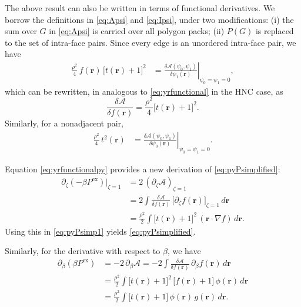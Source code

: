 \documentclass[aip,jcp,reprint,superscriptaddress]{revtex4-1}
\newcommand{\vct}[1]{\mathbf{#1}}
\providecommand{\vr}{} %
\renewcommand{\vr}{\vct{r}}
\newcommand{\supex}[1]{ { { #1 }^{ \mathrm{ex} } } }
\newcommand{\Pex}{\supex{P}}
\newcommand{\A}{\mathcal{A}}
\begin{document}
The above result can also be written
in terms of functional derivatives.
%
We borrow the definitions in
\eqref{eq:Apsi} and \eqref{eq:Ipsi},
under two modifications:
(i) the sum over $G$ in \eqref{eq:Apsi}
is carried over all polygon packs;
(ii) $P(G)$ is replaced to the set of intra-face pairs.
%
Since every edge is an unordered intra-face pair,
we have
%
\begin{align*}
\frac{\rho^2}{4} \, f(\vr) \, \bigl[ t(\vr) + 1 \bigr]^2
&=
\left.
\frac{ \delta \A(\psi_0, \psi_1) } { \delta \psi_1(\vr) }
\right|_{\psi_0 = \psi_1 = 0},
\end{align*}
which can be rewritten,
in analogous to \eqref{eq:yrfunctional} in the HNC case,
as
\begin{equation}
  \frac{ \delta \A } { \delta f(\vr)}
=
  \frac{ \rho^2 } {4}
  \bigl[ t(\vr) + 1 \bigr]^2.
  \label{eq:yrfunctionalpy}
\end{equation}
%
Similarly, for a nonadjacent pair,
\begin{align*}
\frac{\rho^2}{4} \, t^2(\vr)
&=
\left.
\frac{ \delta \A(\psi_0, \psi_1) } { \delta \psi_0(\vr) }
\right|_{\psi_0 = \psi_1 = 0}.
\end{align*}
%


Equation \eqref{eq:yrfunctionalpy} provides a new derivation of \eqref{eq:pyPsimplified}:
%
\begin{align*}
  \partial_\zeta (-\beta \Pex) \big|_{\zeta = 1}
&=
  2 \, (\partial_\zeta \A)_{\zeta = 1}
\\
&=
  2 \int \frac{ \delta \A } { \delta f(\vr) } \,
  \big[ \partial_\zeta f(\vr) \big]_{\zeta = 1} \, d\vr
\\
&=
  \frac{\rho^2}{2}
  \int \bigl[ t(\vr) + 1 \bigr]^2 \,
  (\vr \cdot \nabla f) \, d\vr.
\end{align*}
%
Using this in \eqref{eq:pyPsimp1} yields \eqref{eq:pyPsimplified}.

Similarly,
for the derivative with respect to $\beta$, we have
\begin{align*}
  \partial_\beta (\beta \Pex)
&=
  -2 \, \partial_\beta \A
=
  -2 \int \frac{ \delta \A } { \delta f(\vr) } \,
  \partial_\beta f(\vr) \, d\vr
\\
&=
  \frac{\rho^2}{2}
  \int \bigl[ t(\vr) + 1 \bigr]^2 \,
  \big[ f(\vr) + 1 \bigr] \,
  \phi(\vr) \, d\vr
\\
&=
  \frac{\rho^2}{2}
  \int
  \bigl[ t(\vr) + 1 \bigr] \,
  \phi(\vr) \,
  g(\vr) \,
  d\vr.
\end{align*}
%
\end{document}

